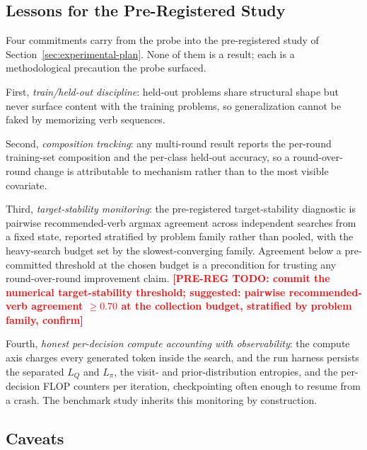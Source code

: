 \subsection{Lessons for the Pre-Registered Study}
\label{sec:pilot-lessons}

Four commitments carry from the probe into the pre-registered study of
Section~\ref{sec:experimental-plan}. None of them is a result; each is a
methodological precaution the probe surfaced.

First, \emph{train/held-out discipline}: held-out problems share structural
shape but never surface content with the training problems, so generalization
cannot be faked by memorizing verb sequences.

Second, \emph{composition tracking}: any multi-round result reports the
per-round training-set composition and the per-class held-out accuracy, so a
round-over-round change is attributable to mechanism rather than to the most
visible covariate.

Third, \emph{target-stability monitoring}: the pre-registered target-stability
diagnostic is pairwise recommended-verb argmax agreement across independent
searches from a fixed state, reported stratified by problem family rather than
pooled, with the heavy-search budget set by the slowest-converging family.
Agreement below a pre-committed threshold at the chosen budget is a precondition
for trusting any round-over-round improvement claim.
\textcolor{red}{\textbf{[PRE-REG TODO: commit the numerical
target-stability threshold; suggested: pairwise recommended-verb
agreement $\geq 0.70$ at the collection budget, stratified by problem
family, confirm]}}

Fourth, \emph{honest per-decision compute accounting with observability}: the
compute axis charges every generated token inside the search, and the run
harness persists the separated $L_Q$ and $L_{\pi}$, the visit- and
prior-distribution entropies, and the per-decision FLOP counters per iteration,
checkpointing often enough to resume from a crash. The benchmark study inherits
this monitoring by construction.

\subsection{Caveats}
\label{sec:pilot-caveats}

